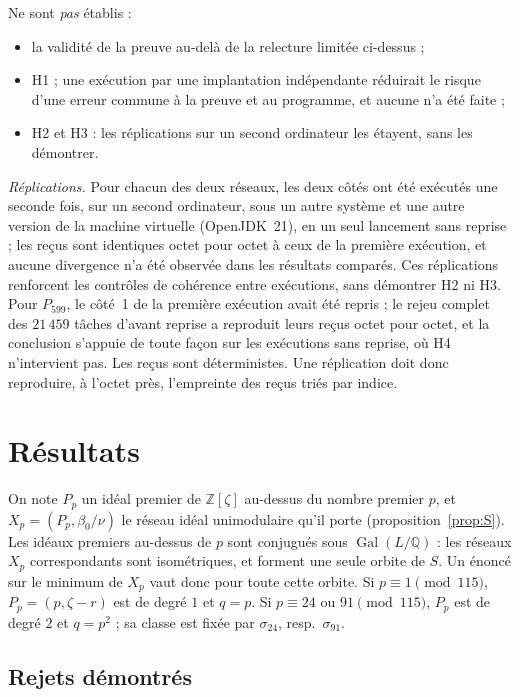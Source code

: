 \documentclass[11pt,a4paper]{amsart}
\theoremstyle{plain}
\theoremstyle{definition}
\numberwithin{equation}{section}
\newcommand{\Q}{\mathbb{Q}}
\newcommand{\Z}{\mathbb{Z}}
\DeclareMathOperator{\Gal}{Gal}
\begin{document}
Ne sont \emph{pas} établis :
\begin{itemize}
\item la validité de la preuve au-delà de la relecture limitée ci-dessus ;
\item H1 ; une exécution par une implantation indépendante réduirait le risque d'une erreur commune à la preuve et au programme, et aucune n'a été faite ;
\item H2 et H3 : les réplications sur un second ordinateur les étayent, sans les démontrer.
\end{itemize}
\emph{Réplications.} Pour chacun des deux réseaux, les deux côtés ont été exécutés une seconde fois, sur un second ordinateur, sous un autre système et une autre version de la machine virtuelle (OpenJDK~21), en un seul lancement sans reprise ; les reçus sont identiques octet pour octet à ceux de la première exécution, et aucune divergence n'a été observée dans les résultats comparés. Ces réplications renforcent les contrôles de cohérence entre exécutions, sans démontrer H2 ni H3. Pour $P_{599}$, le côté~1 de la première exécution avait été repris ; le rejeu complet des $21\,459$ tâches d'avant reprise a reproduit leurs reçus octet pour octet, et la conclusion s'appuie de toute façon sur les exécutions sans reprise, où H4 n'intervient pas.
Les reçus sont déterministes. Une réplication doit donc reproduire, à l'octet près, l'empreinte des reçus triés par indice.

\section{Résultats}\label{sec:resultats}

On note $P_p$ un idéal premier de $\Z[\zeta]$ au-dessus du nombre premier $p$, et $X_p=(P_p,\beta_0/\nu)$ le réseau idéal unimodulaire qu'il porte (proposition~\ref{prop:S}). Les idéaux premiers au-dessus de $p$ sont conjugués sous $\Gal(L/\Q)$ : les réseaux $X_p$ correspondants sont isométriques, et forment une seule orbite de $S$. Un énoncé sur le minimum de $X_p$ vaut donc pour toute cette orbite. Si $p\equiv1\pmod{115}$, $P_p=(p,\zeta-r)$ est de degré $1$ et $q=p$. Si $p\equiv24$ ou $91\pmod{115}$, $P_p$ est de degré $2$ et $q=p^2$ ; sa classe est fixée par $\sigma_{24}$, resp.\ $\sigma_{91}$.

\subsection{Rejets démontrés}\label{subsec:rejets}
\end{document}
